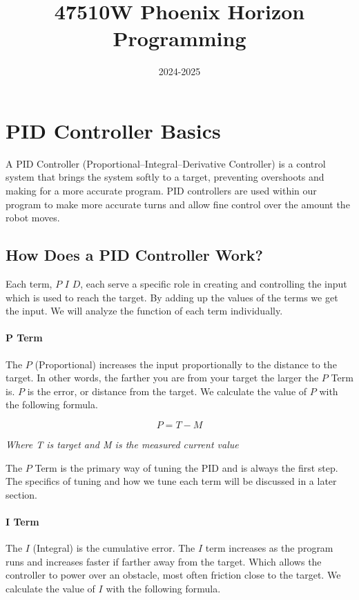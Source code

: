 \documentclass[12pt]{article}
\title{47510W Phoenix Horizon Programming}
\date{2024-2025}
\author{}
\begin{document}
 \maketitle
 \tableofcontents
 \newpage

 \section{PID Controller Basics}
    A PID Controller (Proportional–Integral–Derivative Controller) is a control system that brings the system softly to a target, preventing overshoots and making for a more accurate program. PID controllers are used within our program to make more accurate turns and allow fine control over the amount the robot moves.

\subsection{How Does a PID Controller Work?} \label{howPID}
    Each term, $P$ $I$ $D$, each serve a specific role in creating and controlling the input which is used to reach the target. By adding up the values of the terms we get the input. We will analyze the function of each term individually.

\paragraph{P Term}
    The $P$ (Proportional) increases the input proportionally to the distance to the target. In other words, the farther you are from your target the larger the $P$ Term is. $P$ is the error, or distance from the target. We calculate the value of $P$ with the following formula.

    $$ P = T - M$$
    \begin{center}\em{Where T is target and M is the measured current value}\end{center}

    The $P$ Term is the primary way of tuning the PID and is always the first step. The specifics of tuning and how we tune each term will be discussed in a later section.

\paragraph{I Term}
    The $I$ (Integral) is the cumulative error. The $I$ term increases as the program runs and increases faster if farther away from the target. Which allows the controller to power over an obstacle, most often friction close to the target. We calculate the value of $I$ with the following formula.
\end{document}
